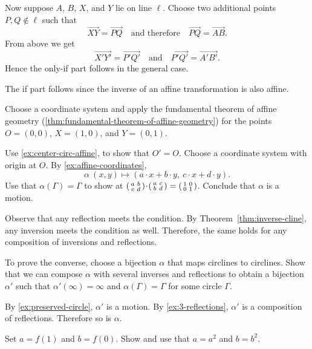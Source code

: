 Now suppose $A$, $B$, $X$, and $Y$ lie on line $\ell$.
Choose two additional points $P,Q\notin\ell$ such that 
\[\overrightarrow{XY}=\overrightarrow{PQ}
\quad\text{and therefore}\quad 
\overrightarrow{PQ}=\overrightarrow{AB}.\]
From above we get 
\[\overrightarrow{X'Y'}=\overrightarrow{P'Q'}
\quad\text{and}\quad 
\overrightarrow{P'Q'}=\overrightarrow{A'B'}.\]
Hence the only-if part follows in the general case.

The if part follows since the inverse of an affine transformation is also affine.
 
Choose a coordinate system and apply the fundamental theorem of affine geometry (\ref{thm:fundamental-theorem-of-affine-geometry}) for the points $O=(0,0)$, $X=(1,0)$, and $Y=(0,1)$.

Use \ref{ex:center-circ-affine}, to show that $O'=O$.
Choose a coordinate system with origin at $O$.
By \ref{ex:affine-coordinates}, 
\[\alpha\:(x,y)\mapsto(a\cdot x+b\cdot y,\ c\cdot x+d\cdot y).\]
Use that $\alpha(\Gamma)=\Gamma$ to show at $(\begin{smallmatrix}a&b\\c&d\end{smallmatrix})\cdot (\begin{smallmatrix}a&c\\b&d\end{smallmatrix})\z=(\begin{smallmatrix}1&0\\0&1\end{smallmatrix})$.
Conclude that $\alpha$ is a motion.

Observe that any reflection meets the condition.
By Theorem~\ref{thm:inverse-cline}, any inversion meets the condition as well.
Therefore, the same holds for any composition of inversions and reflections.

To prove the converse, choose a bijection $\alpha$ that maps circlines to circlines.
Show that we can compose $\alpha$ with several inverses and reflections to obtain a bijection $\alpha'$ such that $\alpha'(\infty)=\infty$ and $\alpha(\Gamma)=\Gamma$ for some circle $\Gamma$.

By \ref{ex:preserved-circle}, $\alpha'$ is a motion.
By \ref{ex:3-reflections}, $\alpha'$ is a composition of reflections.
Therefore so is $\alpha$.

Set $a=f(1)$ and $b=f(0)$.
Show and use that $a=a^2$ and $b=b^2$.

